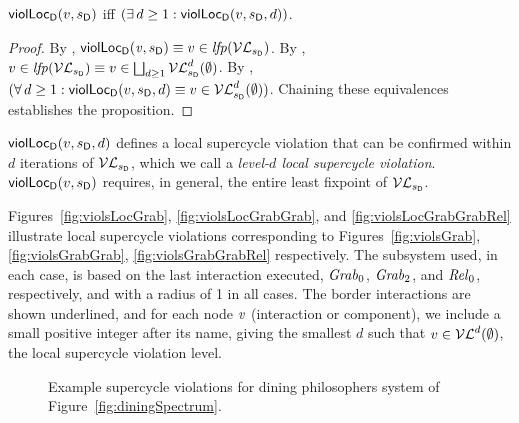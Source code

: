 \begin{proposition}
\label{prop:locViol-equiv-locViolDist}
$\mathsf{violLoc}_{\mathsf{D}}(v,s_\mathsf{D})$ iff $(\exists\, d \ge 1: \mathsf{violLoc}_{\mathsf{D}}(v,s_\mathsf{D},d))$.
\end{proposition}
%
\begin{proof}
By , $\mathsf{violLoc}_{\mathsf{D}}(\mathit{v},s_\mathsf{D}) \equiv v \in \mathit{lfp}(\mathcal{VL}_{s_\mathsf{D}})$.
By , $v \in \mathit{lfp}(\mathcal{VL}_{s_\mathsf{D}}) \equiv v \in \bigsqcup_{d \ge 1} \mathcal{VL}_{s_\mathsf{D}}^{d}(\emptyset)$.
By , $(\forall\, d \ge 1: \mathsf{violLoc}_{\mathsf{D}}(v,s_\mathsf{D},d) \equiv v \in \mathcal{VL}_{s_\mathsf{D}}^{d}(\emptyset))$.
Chaining these equivalences establishes the proposition.
\end{proof}
%
$\mathsf{violLoc}_{\mathsf{D}}(v,s_\mathsf{D},d)$ defines a local supercycle violation that can be confirmed within $d$ iterations of $\mathcal{VL}_{s_\mathsf{D}}$, which we call a
\emph{level-$d$ local supercycle violation}.
$\mathsf{violLoc}_{\mathsf{D}}(v,s_\mathsf{D})$ requires, in general, the entire least fixpoint of $\mathcal{VL}_{s_\mathsf{D}}$.



\begin{example}
\label{exm:loc-dphils-viols}
Figures~\ref{fig:violsLocGrab}, \ref{fig:violsLocGrabGrab}, and \ref{fig:violsLocGrabGrabRel} illustrate local supercycle violations corresponding to
Figures~\ref{fig:violsGrab}, \ref{fig:violsGrabGrab}, \ref{fig:violsGrabGrabRel} respectively. The subsystem used, in each case, is based on the last interaction
executed, \ie $\mathit{Grab}_0$, $\mathit{Grab}_2$, and $\mathit{Rel}_0$, respectively, and with a radius of 1 in all cases.
The border interactions are shown underlined, and 
for each node $\mathit{v}$ (interaction or component), we include a small positive integer after its name, giving the smallest $d$ such that $v \in \mathcal{VL}^{d}(\emptyset)$, 
\ie the local supercycle violation level.
\end{example}



\begin{figure*}[ht]
  \begin{center}
      \quad \quad
       \quad \quad
      \caption{Example supercycle violations for dining philosophers system of Figure~\ref{fig:diningSpectrum}.}
       \label{fig:localDphilsViolations}
  \end{center}
\end{figure*}









